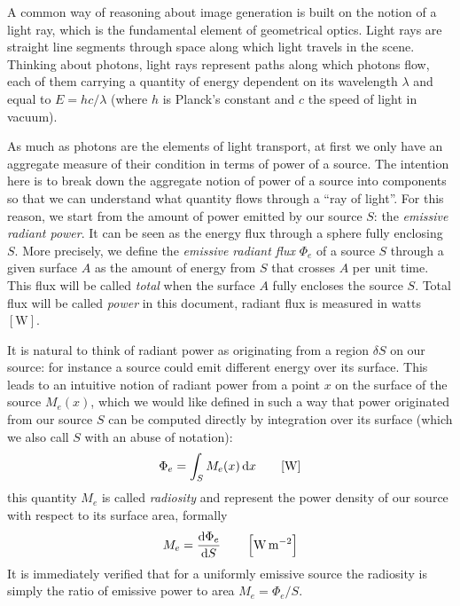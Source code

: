 A common way of reasoning about image generation is built on the notion of a
light ray, which is the fundamental element of geometrical optics. Light rays
are straight line segments through space along which light travels in the scene.
Thinking about photons, light rays represent paths along which photons flow,
each of them carrying a quantity of energy dependent on its wavelength $\lambda$
and equal to $E = hc/\lambda$ (where $h$ is Planck's constant and $c$ the speed
of light in vacuum).

As much as photons are the elements of light transport, at first we only have an
aggregate measure of their condition in terms of power of a source.
The intention here is to break down the aggregate notion of power of a source
into components so that we can understand what quantity flows through a ``ray of
light''.
For this reason, we start from the amount of power emitted by our source $S$:
the \textsl{emissive radiant power}.
It can be seen as the energy flux through a sphere fully enclosing $S$.
More precisely, we define the \textsl{emissive radiant flux} $\Phi_e$ of a
source $S$ through a given surface $A$ as the amount of energy from $S$ that
crosses $A$ per unit time. This flux will be called \textsl{total} when the surface
$A$ fully encloses the source $S$. Total flux will be called \textsl{power} in
this
document, radiant flux is measured in watts $[\si{\watt}]$.

It is natural to think of radiant power as originating from a region $\delta S$ on our source:
for instance a source could emit different energy over its surface. This leads to an
intuitive notion of radiant power from a point $x$ on the surface of the source
$M_e(x)$, which
we would like defined in such a way that power originated from our source $S$
can be computed
directly by integration over its surface (which we also call $S$ with an abuse of notation):
\begin{displaymath}
\Phi_e = \int_{S} M_e(x) \mathop{}\!\mathrm{d} x \qquad [\si{\watt}]
\end{displaymath}
this quantity $M_e$ is called \textsl{radiosity} and represent the power density
of our
source with respect to its surface area, formally
\begin{displaymath}
M_e = \frac{\mathop{}\!\mathrm{d}\Phi_e}{\mathop{}\!\mathrm{d} S} \qquad \left[\si{\watt\per\square\meter}\right]
\end{displaymath}
It is immediately verified that for a uniformly emissive source the
radiosity is simply the ratio of emissive power to area
$M_e = \Phi_e / S$.

